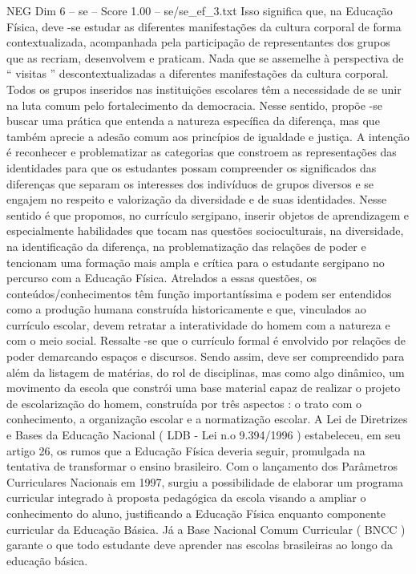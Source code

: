 \begin{textsample}{NEG Dim 6 – se – Score 1.00 – se/se\_ef\_3.txt}
Isso significa que, na Educação Física, deve -se estudar as diferentes manifestações da cultura corporal de forma contextualizada, acompanhada pela participação de representantes dos grupos que as recriam, desenvolvem e praticam.
Nada que se assemelhe à perspectiva de “ visitas ” descontextualizadas a diferentes manifestações da cultura corporal.
Todos os grupos inseridos nas instituições escolares têm a necessidade de se unir na luta comum pelo fortalecimento da democracia.
Nesse sentido, propõe -se buscar uma prática que entenda a natureza específica da diferença, mas que também aprecie a adesão comum aos princípios de igualdade e justiça.
A intenção é reconhecer e problematizar as categorias que constroem as representações das identidades para que os estudantes possam compreender os significados das diferenças que separam os interesses dos indivíduos de grupos diversos e se engajem no respeito e valorização da diversidade e de suas identidades.
Nesse sentido é que propomos, no currículo sergipano, inserir objetos de aprendizagem e especialmente habilidades que tocam nas questões socioculturais, na diversidade, na identificação da diferença, na problematização das relações de poder e tencionam uma formação mais ampla e crítica para o estudante sergipano no percurso com a Educação Física.
Atrelados a essas questões, os conteúdos/conhecimentos têm função importantíssima e podem ser entendidos como a produção humana construída historicamente e que, vinculados ao currículo escolar, devem retratar a interatividade do homem com a natureza e com o meio social.
Ressalte -se que o currículo formal é envolvido por relações de poder demarcando espaços e discursos.
Sendo assim, deve ser compreendido para além da listagem de matérias, do rol de disciplinas, mas como algo dinâmico, um movimento da escola que constrói uma base material capaz de realizar o projeto de escolarização do homem, construída por três aspectos : o trato com o conhecimento, a organização escolar e a normatização escolar.
A Lei de Diretrizes e Bases da Educação Nacional ( LDB - Lei n.o 9.394/1996 ) estabeleceu, em seu artigo 26, os rumos que a Educação Física deveria seguir, promulgada na tentativa de transformar o ensino brasileiro.
Com o lançamento dos Parâmetros Curriculares Nacionais em 1997, surgiu a possibilidade de elaborar um programa curricular integrado à proposta pedagógica da escola visando a ampliar o conhecimento do aluno, justificando a Educação Física enquanto componente curricular da Educação Básica.
Já a Base Nacional Comum Curricular ( BNCC ) garante o que todo estudante deve aprender nas escolas brasileiras ao longo da educação básica.

\end{textsample}
